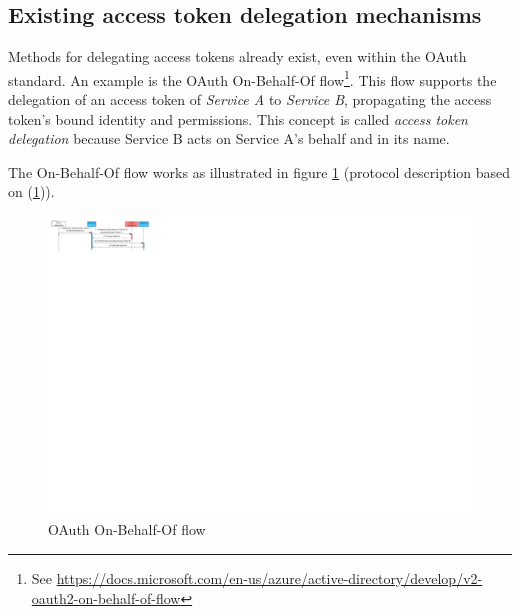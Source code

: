 \subsection{Existing access token delegation mechanisms}
Methods for delegating access tokens already exist, even within the OAuth standard. An example is the OAuth On-Behalf-Of flow\footnote{\label{fn:obo}See \url{https://docs.microsoft.com/en-us/azure/active-directory/develop/v2-oauth2-on-behalf-of-flow}}. This flow supports the delegation of an access token of \textit{Service A} to \textit{Service B}, propagating the access token's bound identity and permissions. This concept is called \textit{access token delegation} because Service B acts on Service A's behalf and in its name. 

The On-Behalf-Of flow works as illustrated in figure \ref{fig:obo-flow} (protocol description based on (\ref{fn:obo})). 

\begin{figure}[H]
    \centering
   \includegraphics[width=1.0\textwidth]{images/macaroons-solid/InteractionDiagram-OBO-Flow.pdf}
    \caption{OAuth On-Behalf-Of flow}
    \label{fig:obo-flow}
\end{figure}

